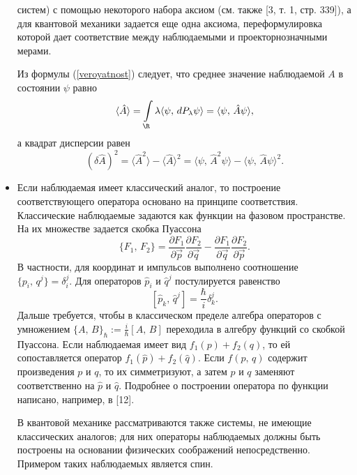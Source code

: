\documentclass[a4paper
]{article}
\begin{document}
\begin{itemize}
систем) с помощью некоторого набора аксиом (см. также [3, т. 1, стр.
339]), а для квантовой механики задается еще одна аксиома, переформулировка
которой дает соответствие между наблюдаемыми и проекторнозначными мерами.
\par
Из формулы (\ref{veroyatnost}) следует, что среднее значение наблюдаемой
$A$ в состоянии $\psi$ равно
$$\langle \hat A\rangle=\int \limits_{\R}\lambda \langle \psi, \,
dP_\lambda\psi\rangle =\langle \psi, \, \hat A\psi\rangle,$$ а
квадрат дисперсии равен $$(\delta \hat A)^2=\langle \hat A^2\rangle-
\langle \hat A\rangle^2=\langle \psi, \, \hat A^2\psi\rangle-
\langle \psi, \, \hat A\psi\rangle^2.$$
\item Если наблюдаемая имеет классический аналог, то построение
соответствующего оператора основано на принципе соответствия. Классические
наблюдаемые задаются как функции на фазовом пространстве. На их множестве
задается скобка Пуассона $$\{F_1, \, F_2\}=\frac{\partial F_1}{\partial
\vec{p}}\frac{\partial F_2}{\partial \vec{q}}-\frac{\partial F_1}{\partial
\vec{q}}\frac{\partial F_2}{\partial \vec{p}}.$$ В частности, для
координат и импульсов выполнено соотношение $\{p_i, \, q^j\}=\delta_i^j$.
Для операторов $\hat p_i$ и $\hat q^j$ постулируется равенство
$$[\hat{p}_k, \, \hat{q}^j]=\frac{\hbar}{i}\delta_k^j.$$ Дальше
требуется, чтобы в классическом пределе алгебра операторов с умножением
$\{A, \, B\}_{\hbar}:=\frac{i}{\hbar}[A, \, B]$ переходила в алгебру
функций со скобкой Пуассона. Если наблюдаемая имеет вид $f_1(p)+
f_2(q)$, то ей сопоставляется оператор $f_1(\hat p)+f_2(\hat q)$.
Если $f(p, \, q)$ содержит произведения $p$ и $q$, то их симметризуют,
а затем $p$ и $q$ заменяют соответственно на $\hat p$ и $\hat q$.
Подробнее о построении оператора по функции написано, например,
в [12]. \par
В квантовой механике рассматриваются также системы, не имеющие
классических аналогов; для них операторы наблюдаемых должны быть
построены на основании физических соображений непосредственно.
Примером таких наблюдаемых является спин.
\end{itemize}
\end{document}
